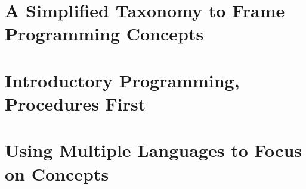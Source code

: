 
\section{A Simplified Taxonomy to Frame Programming Concepts} %
\label{sec:a_simplified_taxonomy_to_frame_programming_concepts}


\section{Introductory Programming, Procedures First} %
\label{sec:introductory_programming_procedures_first}


\section{Using Multiple Languages to Focus on Concepts} %
\label{sec:using_multiple_languages_to_focus_on_concepts}



